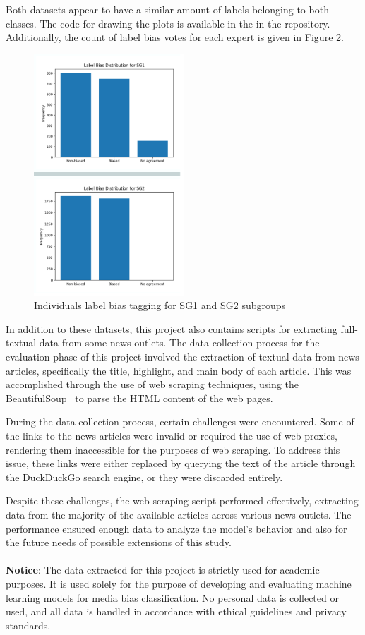 \documentclass[11pt,a4paper]{article}
\begin{document}
Both datasets appear to have a similar amount of labels belonging to both classes.
The code for drawing the plots is available in the  in the repository.
Additionally, the count of label bias votes for each expert is given in Figure 2.
\begin{figure}[h]
\centering
\includegraphics[width=0.5\textwidth]{SG_lb_bias.png}
\caption{Individuals label bias tagging for SG1 and SG2 subgroups}
\label{fig:my_label}
\end{figure}
In addition to these datasets, this project also contains scripts for extracting full-textual data from some news outlets. The data collection process for the evaluation phase of this project involved the extraction of textual data from news articles, specifically the title, highlight, and main body of each article. This was accomplished through the use of web scraping techniques, using the BeautifulSoup~\cite{richardson2007beautiful} to parse the HTML content of the web pages.

During the data collection process, certain challenges were encountered. Some of the links to the news articles were invalid or required the use of web proxies, rendering them inaccessible for the purposes of web scraping. To address this issue, these links were either replaced by querying the text of the article through the DuckDuckGo search engine, or they were discarded entirely.

Despite these challenges, the web scraping script performed effectively, extracting data from the majority of the available articles across various news outlets. The performance ensured enough data to analyze the model's behavior and also for the future needs of possible extensions of this study.\\
\\
\textbf{Notice}: The data extracted for this project is strictly used for academic purposes. It is used solely for the purpose of developing and evaluating machine learning models for media bias classification. No personal data is collected or used, and all data is handled in accordance with ethical guidelines and privacy standards.
\end{document}
